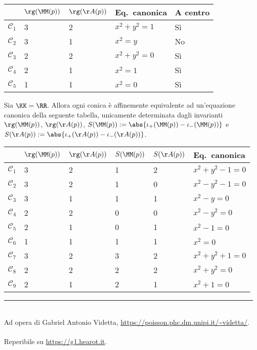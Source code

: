 \documentclass[10pt,landscape]{article}
\begin{document}
\begin{multicols}{3}
		\begin{center}
			\tiny
			\begin{tabular}{|l|l|l|l|l|}
				\hline
				& $\rg(\MM(p))$ & $\rg(\AA(p))$ & Eq.~canonica & A centro \\ \hline
				$\mathcal{C}_1$ & 3             & 2             & $x^2+y^2=1$        & Sì       \\ \hline
				$\mathcal{C}_2$ & 3             & 1             & $x^2=y$            & No       \\ \hline
				$\mathcal{C}_3$ & 2             & 2             & $x^2+y^2=0$        & Sì       \\ \hline
				$\mathcal{C}_4$ & 2             & 1             & $x^2=1$          & Sì       \\ \hline
				$\mathcal{C}_5$ & 1             & 1             & $x^2=0$            & Sì       \\ \hline
			\end{tabular}
		\end{center}

		Sia $\KK=\RR$. Allora ogni conica è affinemente equivalente ad
		un'equazione canonica della seguente tabella, unicamente
		determinata dagli invarianti $\rg(\MM(p))$, $\rg(\AA(p))$,
		$S(\MM(p)) := \abs{\iota_+(\MM(p)) - \iota_-(\MM(p))}$ e
		$S(\AA(p)) := \abs{\iota_+(\AA(p)) - \iota_-(\AA(p))}$. \\[0.1in]
		
		\begin{center}
			\tiny
			\begin{tabular}{|l|l|l|l|l|l|}
				\hline
				& $\rg(\MM(p))$ & $\rg(\AA(p))$ & $S(\MM(p))$ & $S(\AA(p))$ & Eq.~canonica \\ \hline
				$\mathcal{C}_1$ & 3 & 2 & 1 & 2 & $x^2+y^2-1=0$ \\ \hline
				$\mathcal{C}_2$ & 3 & 2 & 1 & 0 & $x^2-y^2-1=0$ \\ \hline
				$\mathcal{C}_3$ & 3 & 1 & 1 & 1 & $x^2-y=0$ \\ \hline
				$\mathcal{C}_4$ & 2 & 2 & 0 & 0 & $x^2-y^2=0$ \\ \hline
				$\mathcal{C}_5$ & 2 & 1 & 0 & 1 & $x^2-1=0$ \\ \hline
				$\mathcal{C}_6$ & 1 & 1 & 1 & 1 & $x^2=0$ \\ \hline
				$\mathcal{C}_7$ & 3 & 2 & 3 & 2 & $x^2+y^2+1=0$ \\ \hline
				$\mathcal{C}_8$ & 2 & 2 & 2 & 2 & $x^2+y^2=0$ \\ \hline
				$\mathcal{C}_9$ & 2 & 1 & 2 & 1 & $x^2+1=0$ \\ \hline
			\end{tabular}
		\end{center}
		
		\vfill
		\hrule
		~\\
		Ad opera di Gabriel Antonio Videtta, \url{https://poisson.phc.dm.unipi.it/~videtta/}.
		~\\Reperibile su
		\url{https://g1.hearot.it}.
	\end{multicols}
	
\end{document}
